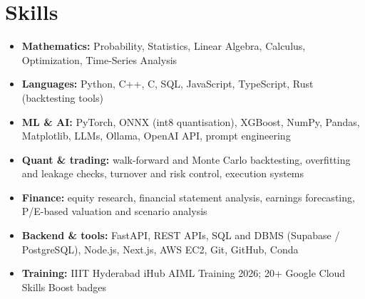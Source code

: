 \documentclass[letterpaper,10pt]{article}
\begin{document}
\section{Skills}
\begin{itemize}
  \item \textbf{Mathematics:} Probability, Statistics, Linear Algebra, Calculus, Optimization, Time-Series Analysis
  \item \textbf{Languages:} Python, C++, C, SQL, JavaScript, TypeScript, Rust (backtesting tools)
  \item \textbf{ML \& AI:} PyTorch, ONNX (int8 quantisation), XGBoost, NumPy, Pandas, Matplotlib, LLMs, Ollama, OpenAI API,
        prompt engineering
  \item \textbf{Quant \& trading:} walk-forward and Monte Carlo backtesting, overfitting and leakage checks, turnover and risk
        control, execution systems
  \item \textbf{Finance:} equity research, financial statement analysis, earnings forecasting, P/E-based valuation and scenario
        analysis
  \item \textbf{Backend \& tools:} FastAPI, REST APIs, SQL and DBMS (Supabase / PostgreSQL), Node.js, Next.js, AWS EC2, Git,
        GitHub, Conda
  \item \textbf{Training:} IIIT Hyderabad iHub AIML Training 2026; 20+ Google Cloud Skills Boost badges
\end{itemize}
\end{document}
